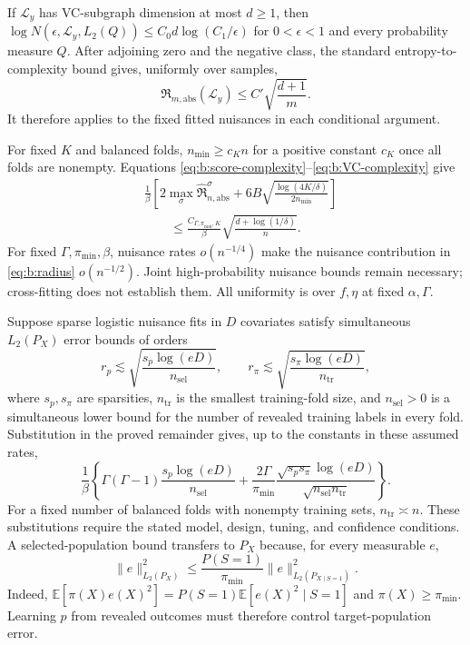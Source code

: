 If $\mathcal L_y$ has VC-subgraph dimension at most $d\geq1$, then
$\log N(\epsilon,\mathcal L_y,L_2(Q))\leq C_0d\log(C_1/\epsilon)$
for $0<\epsilon<1$ and every probability measure $Q$.
After adjoining zero and the negative class, the standard entropy-to-complexity
bound \cite{van1996weak,bartlett2002rademacher} gives, uniformly over samples,
\begin{equation}
 \widehat{\mathfrak R}_{m,\mathrm{abs}}(\mathcal L_y)
 \leq C'\sqrt{\frac{d+1}{m}}.
 \label{eq:b:VC-complexity}
\end{equation}
It therefore applies to the fixed fitted nuisances in each conditional argument.

For fixed $K$ and balanced folds, $n_{\min}\geq c_Kn$ for a positive
constant $c_K$ once all folds are nonempty. Equations
\eqref{eq:b:score-complexity}--\eqref{eq:b:VC-complexity} give
\begin{equation}
 \begin{aligned}
 &\frac1\beta\left[
 2\max_\sigma\widehat{\mathfrak R}_{n,\mathrm{abs}}^\sigma
 +6B\sqrt{\frac{\log(4K/\delta)}{2n_{\min}}}\right]\\
 &\qquad\leq \frac{C_{\Gamma,\pi_{\min},K}}{\beta}
 \sqrt{\frac{d+\log(1/\delta)}{n}}.
 \end{aligned}
 \label{eq:b:VC-rate}
\end{equation}
For fixed $\Gamma,\pi_{\min},\beta$, nuisance rates $o(n^{-1/4})$ make
the nuisance contribution in \eqref{eq:b:radius} $o(n^{-1/2})$.
Joint high-probability nuisance bounds remain necessary; cross-fitting
does not establish them. All uniformity is over $f,\eta$ at fixed
$\alpha,\Gamma$.

\begin{example}
\label{ex:b:sparse-nuisances}
Suppose sparse logistic nuisance fits in $D$ covariates satisfy simultaneous
$L_2(P_X)$ error bounds of orders
\[
 r_p\lesssim\sqrt{\frac{s_p\log(eD)}{n_{\mathrm{sel}}}},\qquad
 r_\pi\lesssim\sqrt{\frac{s_\pi\log(eD)}{n_{\mathrm{tr}}}},
\]
where $s_p,s_\pi$ are sparsities, $n_{\mathrm{tr}}$ is the smallest training-fold
size, and $n_{\mathrm{sel}}>0$ is a simultaneous lower bound for the number of
revealed training labels in every fold. Substitution in the proved remainder
gives, up to the constants in these assumed rates,
\[
 \frac1\beta\left\{
 \Gamma(\Gamma-1)\frac{s_p\log(eD)}{n_{\mathrm{sel}}}
 +\frac{2\Gamma}{\pi_{\min}}
 \frac{\sqrt{s_ps_\pi}\log(eD)}{\sqrt{n_{\mathrm{sel}}n_{\mathrm{tr}}}}
 \right\}.
\]
For a fixed number of balanced folds with nonempty training sets,
$n_{\mathrm{tr}}\asymp n$. These substitutions
require the stated model, design, tuning, and confidence conditions.
A selected-population bound transfers to $P_X$ because, for every measurable $e$,
\begin{equation}
 \|e\|_{L_2(P_X)}^2
 \leq\frac{P(S=1)}{\pi_{\min}}
 \|e\|_{L_2(P_{X\mid S=1})}^2.
 \label{eq:b:selected-norm-transfer}
\end{equation}
Indeed, $\mathbb E[\pi(X)e(X)^2]
=P(S=1)\mathbb E[e(X)^2\mid S=1]$ and $\pi(X)\geq\pi_{\min}$.
Learning $p$ from revealed outcomes must therefore control target-population error.
\end{example}

